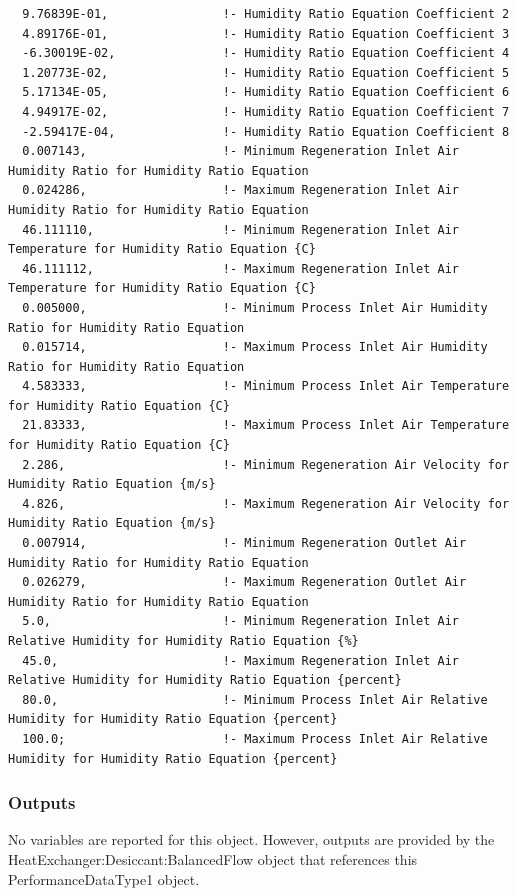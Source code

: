 \begin{lstlisting}
  9.76839E-01,                !- Humidity Ratio Equation Coefficient 2
  4.89176E-01,                !- Humidity Ratio Equation Coefficient 3
  -6.30019E-02,               !- Humidity Ratio Equation Coefficient 4
  1.20773E-02,                !- Humidity Ratio Equation Coefficient 5
  5.17134E-05,                !- Humidity Ratio Equation Coefficient 6
  4.94917E-02,                !- Humidity Ratio Equation Coefficient 7
  -2.59417E-04,               !- Humidity Ratio Equation Coefficient 8
  0.007143,                   !- Minimum Regeneration Inlet Air Humidity Ratio for Humidity Ratio Equation
  0.024286,                   !- Maximum Regeneration Inlet Air Humidity Ratio for Humidity Ratio Equation
  46.111110,                  !- Minimum Regeneration Inlet Air Temperature for Humidity Ratio Equation {C}
  46.111112,                  !- Maximum Regeneration Inlet Air Temperature for Humidity Ratio Equation {C}
  0.005000,                   !- Minimum Process Inlet Air Humidity Ratio for Humidity Ratio Equation
  0.015714,                   !- Maximum Process Inlet Air Humidity Ratio for Humidity Ratio Equation
  4.583333,                   !- Minimum Process Inlet Air Temperature for Humidity Ratio Equation {C}
  21.83333,                   !- Maximum Process Inlet Air Temperature for Humidity Ratio Equation {C}
  2.286,                      !- Minimum Regeneration Air Velocity for Humidity Ratio Equation {m/s}
  4.826,                      !- Maximum Regeneration Air Velocity for Humidity Ratio Equation {m/s}
  0.007914,                   !- Minimum Regeneration Outlet Air Humidity Ratio for Humidity Ratio Equation
  0.026279,                   !- Maximum Regeneration Outlet Air Humidity Ratio for Humidity Ratio Equation
  5.0,                        !- Minimum Regeneration Inlet Air Relative Humidity for Humidity Ratio Equation {%}
  45.0,                       !- Maximum Regeneration Inlet Air Relative Humidity for Humidity Ratio Equation {percent}
  80.0,                       !- Minimum Process Inlet Air Relative Humidity for Humidity Ratio Equation {percent}
  100.0;                      !- Maximum Process Inlet Air Relative Humidity for Humidity Ratio Equation {percent}
\end{lstlisting}

\subsubsection{Outputs}\label{outputs-3-008}

No variables are reported for this object. However, outputs are provided by the HeatExchanger:Desiccant:BalancedFlow object that references this PerformanceDataType1 object.
